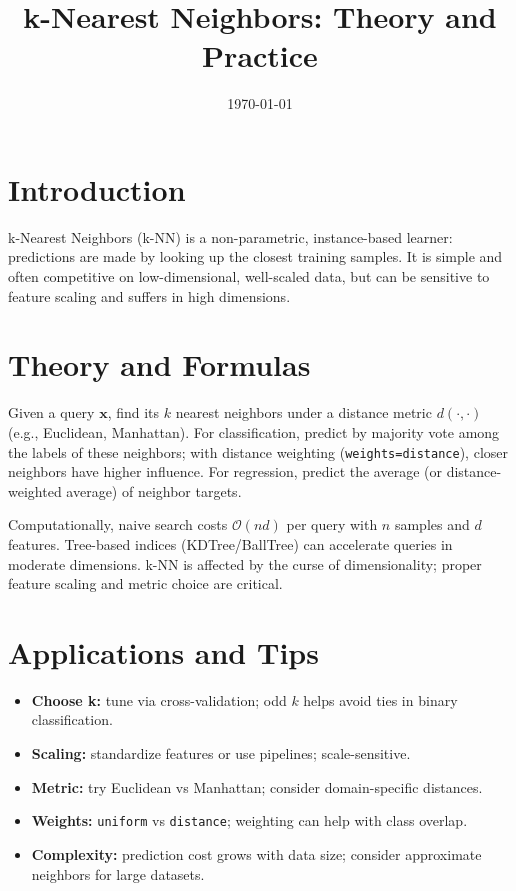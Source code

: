 \documentclass[11pt]{article}
\title{k-Nearest Neighbors: Theory and Practice}
\author{}
\date{\today}
\begin{document}
\maketitle

\section{Introduction}
k-Nearest Neighbors (k-NN) is a non-parametric, instance-based learner: predictions are made by looking up the closest training samples. It is simple and often competitive on low-dimensional, well-scaled data, but can be sensitive to feature scaling and suffers in high dimensions.

\section{Theory and Formulas}
Given a query $\mathbf{x}$, find its $k$ nearest neighbors under a distance metric $d(\cdot,\cdot)$ (e.g., Euclidean, Manhattan). For classification, predict by majority vote among the labels of these neighbors; with distance weighting (\texttt{weights=distance}), closer neighbors have higher influence. For regression, predict the average (or distance-weighted average) of neighbor targets.

Computationally, naive search costs $\mathcal{O}(nd)$ per query with $n$ samples and $d$ features. Tree-based indices (KDTree/BallTree) can accelerate queries in moderate dimensions. k-NN is affected by the curse of dimensionality; proper feature scaling and metric choice are critical.

\section{Applications and Tips}
\begin{itemize}
  \item \textbf{Choose k:} tune via cross-validation; odd $k$ helps avoid ties in binary classification.
  \item \textbf{Scaling:} standardize features or use pipelines; scale-sensitive.
  \item \textbf{Metric:} try Euclidean vs Manhattan; consider domain-specific distances.
  \item \textbf{Weights:} \texttt{uniform} vs \texttt{distance}; weighting can help with class overlap.
  \item \textbf{Complexity:} prediction cost grows with data size; consider approximate neighbors for large datasets.
\end{itemize}
\end{document}

